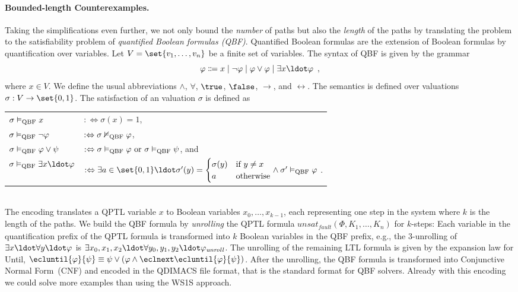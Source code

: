 \documentclass{LMCS}
\newcommand{\unsatnf}{\mathit{unsat}_\mathit{fault}}
\newcommand{\modelsqbf}{\vDash_\text{\rm QBF}}
\newcommand{\nmodelsqbf}{\nvDash_\text{\rm QBF}}
\theoremstyle{plain}\newtheorem{theorem}[thm]{Theorem}
\theoremstyle{plain}\newtheorem{lemma}[thm]{Lemma}
\theoremstyle{plain}\newtheorem{proposition}[thm]{Proposition}
\theoremstyle{plain}\newtheorem{corollary}[thm]{Corollary}
\theoremstyle{definition}\newtheorem{definition}{Definition}[section]
\begin{document}
\paragraph{\bf Bounded-length Counterexamples.}
Taking the simplifications even further, we not only bound the \emph{number} of paths but also the \emph{length} of the paths by translating the problem to the satisfiability problem of \emph{quantified Boolean formulas (QBF)}.
Quantified Boolean formulas are the extension of Boolean formulas by quantification over variables.
Let $V = \set{v_1,\dots,v_n}$ be a finite set of variables.
The syntax of QBF is given by the grammar
\begin{equation*} \label{eq:qbf_syntax}
  \varphi \Coloneqq x \mid \neg\varphi \mid \varphi \lor \varphi \mid \exists x \ldot \varphi \enspace,
\end{equation*}
where $x \in V$.
We define the usual abbreviations $\land$, $\forall$, $\true$, $\false$, $\rightarrow$, and $\leftrightarrow$.
The semantics is defined over valuations $\sigma : V \rightarrow \set{0,1}$. The satisfaction of an valuation $\sigma$ is defined as\smallskip\\
\begin{tabular}{L l}
  $\sigma \modelsqbf x$ & $:\Leftrightarrow \sigma(x) = 1$,\\[1pt]
  $\sigma \modelsqbf \neg\varphi$ & $:\Leftrightarrow \sigma \nmodelsqbf \varphi$, \\[1pt]
  $\sigma \modelsqbf \varphi \lor \psi$ & $:\Leftrightarrow \sigma \modelsqbf \varphi \text{ or } \sigma \modelsqbf \psi$, and\\[1pt]
  $\sigma \modelsqbf \exists x \ldot \varphi$ & $:\Leftrightarrow \exists a \in \set{0,1} \ldot \sigma'(y) = \begin{cases} \sigma(y) & \text{if } y \neq x \\ a & \text{otherwise} \end{cases} \land \sigma' \modelsqbf \varphi$ \enspace.
\end{tabular}\smallskip\\
The encoding translates a QPTL variable $x$ to Boolean variables $x_0,\dots,x_{k-1}$, each representing one step in the system where $k$ is the length of the paths.
We build the QBF formula by \emph{unrolling} the QPTL formula $\unsatnf(\Phi,K_1,\dots,K_n)$ for $k$-steps: Each variable in the quantification prefix of the QPTL formula is transformed into $k$ Boolean variables in the QBF prefix, e.g., the 3-unrolling of $\exists x \ldot \forall y \ldot \varphi$ is $\exists x_0, x_1, x_2 \ldot \forall y_0, y_1, y_2 \ldot \varphi_\mathit{unroll}$.
The unrolling of the remaining LTL formula is given by the expansion law for Until, $\ecluntil{\varphi}{\psi} \equiv \psi \lor (\varphi \land \eclnext \ecluntil{\varphi}{\psi})$.
After the unrolling, the QBF formula is transformed into Conjunctive Normal Form~(CNF) and encoded in the QDIMACS file format, that is the standard format for QBF solvers.
Already with this encoding we could solve more examples than using the WS1S approach.
\end{document}
